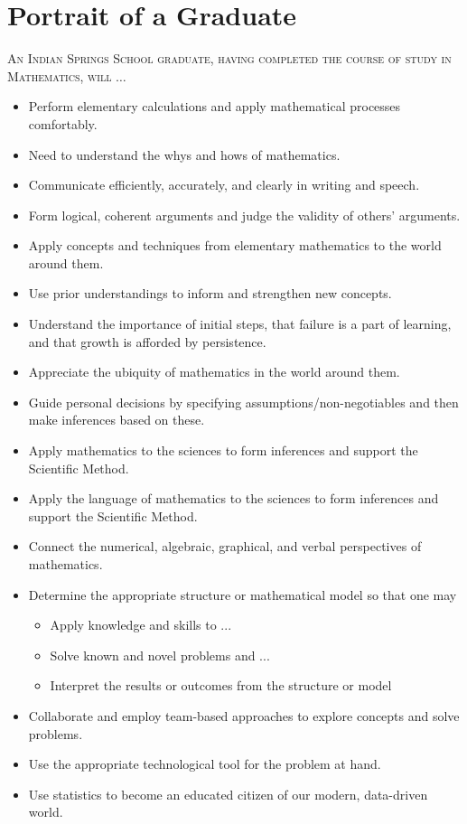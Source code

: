 \section{Portrait of a Graduate}

\textsc{An Indian Springs School graduate, having completed the course of study in Mathematics, will} $\ldots$ 

\begin{itemize}
  \item Perform elementary calculations and apply mathematical processes comfortably.
\item Need to understand the whys and hows of mathematics.
\item Communicate efficiently, accurately, and clearly in writing and speech.
\item Form logical, coherent arguments and judge the validity of others’ arguments.
\item Apply concepts and techniques from elementary mathematics to the world around them.
\item Use prior understandings to inform and strengthen new concepts.
\item Understand the importance of initial steps, that failure is a part of learning, and that growth is afforded by persistence.
\item Appreciate the ubiquity of mathematics in the world around them.
\item Guide personal decisions by specifying assumptions/non-negotiables and then make inferences based on these.
\item Apply mathematics to the sciences to form inferences and support the Scientific Method.
\item Apply the language of mathematics to the sciences to form inferences and support the Scientific Method.
\item Connect the numerical, algebraic, graphical, and verbal perspectives of mathematics.
\item Determine the appropriate structure or mathematical model so that one may
\begin{itemize}
\item Apply knowledge and skills to ...
\item Solve known and novel problems and ...
\item Interpret the results or outcomes from the structure or model
\end{itemize}
\item Collaborate and employ team-based approaches to explore concepts and solve problems.
\item Use the appropriate technological tool for the problem at hand.
\item Use statistics to become an educated citizen of our modern, data-driven world.

\end{itemize}